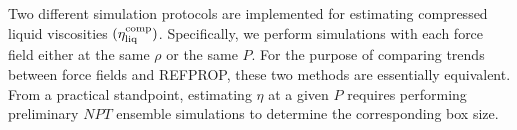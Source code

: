 \documentclass[preprint,review,12pt]{elsarticle}
\begin{document}
	Two different simulation protocols are implemented for estimating compressed liquid viscosities $(\eta_{\rm liq}^{\rm comp})$. Specifically, we perform simulations with each force field either at the same $\rho$ or the same $P$. For the purpose of comparing trends between force fields and REFPROP, these two methods are essentially equivalent. From a practical standpoint, estimating $\eta$ at a given $P$ requires performing preliminary $NPT$ ensemble simulations to determine the corresponding box size.
	
	
%	 
	
	
	
\end{document}
